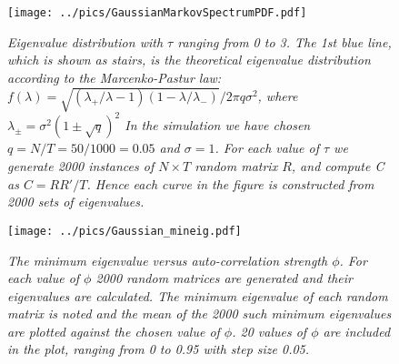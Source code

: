 \documentclass{report}
\begin{document}

\begin{figure}[htb!]
  \begin{center}
    \texttt{[image: ../pics/GaussianMarkovSpectrumPDF.pdf]}
  \end{center}
  \vspace{-10mm}
  \caption{\small \it
      Eigenvalue distribution with $\tau$ ranging from 0 to
      3. The 1st blue line, which is shown as stairs, is the
      theoretical eigenvalue distribution according to the
      Marcenko-Pastur law: $f(\lambda) = \sqrt{(\lambda_+/\lambda - 1)(1
        - \lambda/\lambda_-)}/2\pi q \sigma^2$, where $\lambda_{\pm} =
      \sigma^2(1 \pm \sqrt{q})^2$ In the simulation we have
      chosen $q = N/T = 50/1000 = 0.05$ and $\sigma=1$. For each value
      of $\tau$ we generate 2000 instances of $N \times T$ random matrix
      $R$, and compute C as $C=RR'/T$. Hence each curve in the figure is
      constructed from 2000 sets of eigenvalues.
    }
  \label{fig:GaussianMarkovSpectrumPDF}
\end{figure}

\begin{figure}[htb!]
  \centering
  \texttt{[image: ../pics/Gaussian\_mineig.pdf]}
  \caption{\small \it The minimum eigenvalue versus
    auto-correlation strength $\phi$. For each value of $\phi$ 2000
    random matrices are generated and their eigenvalues are
    calculated. The minimum eigenvalue of each random matrix is noted
    and the mean of the 2000 such minimum eigenvalues are plotted
    against the chosen value of $\phi$. 20 values of $\phi$ are
    included in the plot, ranging from 0 to 0.95 with step size 0.05.}
  \label{fig:Gaussian_mineig}
\end{figure}
\end{document}
